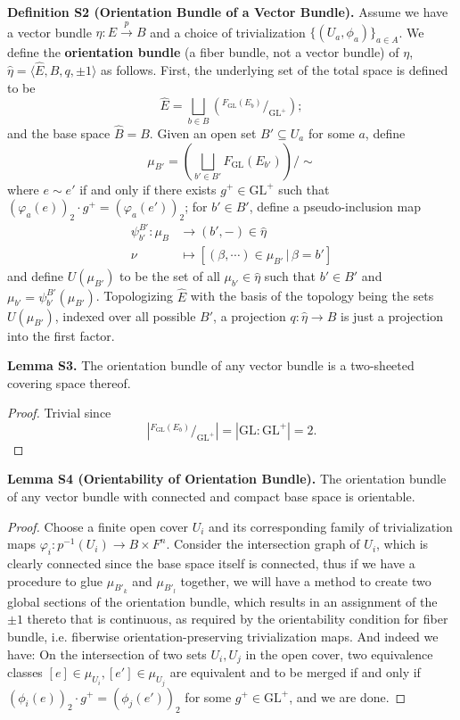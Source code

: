 \colorbox{red!30}{\textbf{Definition S2 (Orientation Bundle of a Vector Bundle).}} Assume we have a vector bundle $\eta:E\overset{p}{\to}B$ and a choice of trivialization $\{(U_a,\phi_a)\}_{a\in A}$. We define the \textbf{orientation bundle} (a fiber bundle, not a vector bundle) of $\eta$, $\hat{\eta}=\langle\hat{E},B,q,\pm1\rangle$ as follows. First, the underlying set of the total space is defined to be $$\hat{E}=\bigsqcup_{b\in B}\left(^{F_{\mathrm{GL}}(E_b)}\big/_{\mathrm{GL}^+}\right);$$ and the base space $\hat{B}=B$. Given an open set $B'\subseteq U_a$ for some $a$, define $$\mu_{B'}={\displaystyle\left(\bigsqcup_{b'\in B'}F_{\mathrm{GL}}(E_{b'})\right)}\Big/{\sim}$$ where $e\sim e'$ if and only if there exists $g^+\in\mathrm{GL}^+$ such that $(\varphi_a(e))_2\cdot g^+=(\varphi_a(e'))_2$; for $b'\in B'$, define a pseudo-inclusion map \begin{align*}\psi^{B'}_{b'}:\mu_B&\to(b',-)\in\hat{\eta}\\\nu&\mapsto[(\beta,\cdots)\in\mu_{B'}\,\big|\,\beta=b']\end{align*} and define $U(\mu_{B'})$ to be the set of all $\mu_{b'}\in\hat{\eta}$ such that $b'\in B'$ and $\mu_{b'}=\psi^{B'}_{b'}(\mu_{B'})$. Topologizing $\hat{E}$ with the basis of the topology being the sets $U(\mu_{B'})$, indexed over all possible $B'$, a projection $q:\hat{\eta}\to B$ is just a projection into the first factor.

\colorbox{red!30}{\textbf{Lemma S3.}} The orientation bundle of any vector bundle is a two-sheeted covering space thereof.
\begin{proof}
Trivial since $$\left|^{F_{\mathrm{GL}}(E_b)}\big/_{\mathrm{GL}^+}\right|=|\mathrm{GL}:\mathrm{GL}^+|=2.$$
\end{proof}

\colorbox{red!30}{\textbf{Lemma S4 (Orientability of Orientation Bundle).}} The orientation bundle of any vector bundle with connected and compact base space is orientable.
\begin{proof}
Choose a finite open cover $U_i$ and its corresponding family of trivialization maps $\varphi_i:p^{-1}(U_i)\to B\times F^n$. Consider the intersection graph of $U_i$, which is clearly connected since the base space itself is connected, thus if we have a procedure to glue $\mu_{B'_k}$ and $\mu_{B'_l}$ together, we will have a method to create two global sections of the orientation bundle, which results in an assignment of the $\pm1$ thereto that is continuous, as required by the orientability condition for fiber bundle, i.e. fiberwise orientation-preserving trivialization maps. And indeed we have: On the intersection of two sets $U_i,U_j$ in the open cover, two equivalence classes $[e]\in\mu_{U_i},[e']\in\mu_{U_j}$ are equivalent and to be merged if and only if $(\phi_i(e))_2\cdot g^+=(\phi_j(e'))_2$ for some $g^+\in\mathrm{GL}^+$, and we are done.
\end{proof}


